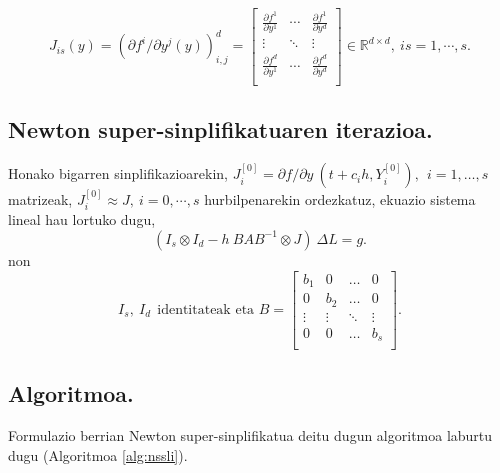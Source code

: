 \begin{equation*}
\label{eq:907}
J_{is}(y)=\left(\partial f^i/\partial y^j (y)\right)_{i,j}^d=
\begin{bmatrix}
    \frac{\partial f^1}{\partial y^1} & \cdots & \frac{\partial f^1}{\partial y^d}\\    
    \vdots & \ddots & \vdots \\    
    \frac{\partial f^d}{\partial y^1} & \cdots & \frac{\partial f^d}{\partial y^d}\\    
\end{bmatrix} \in \mathbb{R}^{d \times d}, \ is=1,\cdots,s.
\end{equation*}

\subsection*{Newton super-sinplifikatuaren iterazioa.}

Honako bigarren sinplifikazioarekin, $J_i^{[0]}=\partial f / \partial y \ (t+c_ih, Y_i^{[0]}), \ \  i=1,\dots,s$ matrizeak,  $J_i^{[0]} \approx J, \ i=0,\cdots,s$ hurbilpenarekin ordezkatuz, ekuazio sistema lineal hau lortuko dugu,
\begin{equation}
(I_s \otimes I_d - h \ BAB^{-1} \otimes J) \ \Delta L = g. 
\end{equation}
non
\begin{equation*}
I_s,\ I_d \ \ \text{identitateak eta }B=
\begin{bmatrix}
   b_{1} & 0      & \dots & 0 \\
   0     & b_{2}  & \dots & 0 \\
    \vdots & \vdots & \ddots  & \vdots \\
   0     & 0      & \dots & b_{s}\\
\end{bmatrix}.     
\end{equation*}

\subsection*{Algoritmoa.}

Formulazio berrian Newton super-sinplifikatua deitu dugun algoritmoa laburtu dugu (Algoritmoa \ref{alg:nssli}).

